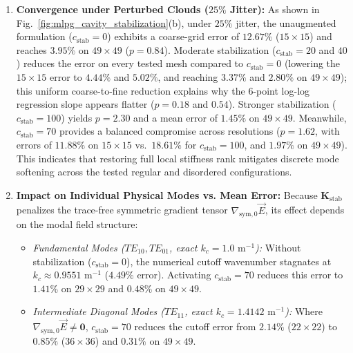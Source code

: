 \documentclass[VANCOUVER,Times1COL]{WileyNJD-v5}
\begin{document}
\begin{enumerate}
    For applications restricted to very coarse point clouds ($15 \times 15$ to $22 \times 22$), a small parameter $c_{\mathrm{stab}} \in [0, 20]$ therefore yields better coarse accuracy ($3.87\%\text{--}6.69\%$) at the cost of slower asymptotic convergence ($p \le 1.06$). Higher stabilization ($c_{\mathrm{stab}} \ge 70$), on the other hand, recovers near-quadratic empirical rates ($p \ge 2.15$) on the tested mesh sequence.
    \item \textbf{Convergence under Perturbed Clouds ($25\%$ Jitter):} As shown in Fig.~\ref{fig:mlpg_cavity_stabilization}(b), under $25\%$ jitter, the unaugmented formulation ($c_{\mathrm{stab}} = 0$) exhibits a coarse-grid error of $12.67\%$ ($15\times 15$) and reaches $3.95\%$ on $49 \times 49$ ($p = 0.84$). Moderate stabilization ($c_{\mathrm{stab}} = 20$ and $40$) reduces the error on every tested mesh compared to $c_{\mathrm{stab}} = 0$ (lowering the $15\times 15$ error to $4.44\%$ and $5.02\%$, and reaching $3.37\%$ and $2.80\%$ on $49\times 49$); this uniform coarse-to-fine reduction explains why the 6-point log-log regression slope appears flatter ($p = 0.18$ and $0.54$). Stronger stabilization ($c_{\mathrm{stab}} = 100$) yields $p = 2.30$ and a mean error of $\mathbf{1.45\%}$ on $49 \times 49$. Meanwhile, $c_{\mathrm{stab}} = 70$ provides a balanced compromise across resolutions ($p = 1.62$, with errors of $11.88\%$ on $15 \times 15$ vs.\ $18.61\%$ for $c_{\mathrm{stab}} = 100$, and $1.97\%$ on $49 \times 49$). This indicates that restoring full local stiffness rank mitigates discrete mode softening across the tested regular and disordered configurations.
\item \textbf{Impact on Individual Physical Modes vs. Mean Error:}
Because $\mathbf{K}_{\mathrm{stab}}$ penalizes the trace-free symmetric gradient tensor $\nabla_{\mathrm{sym},0}\vec{E}$, its effect depends on the modal field structure:
\begin{itemize}
    \item \emph{Fundamental Modes ($TE_{10}, TE_{01}$, exact $k_c = 1.0\text{ m}^{-1}$):} Without stabilization ($c_{\mathrm{stab}} = 0$), the numerical cutoff wavenumber stagnates at $k_c \approx 0.9551\text{ m}^{-1}$ ($4.49\%$ error). Activating $c_{\mathrm{stab}} = 70$ reduces this error to $1.41\%$ on $29 \times 29$ and $\mathbf{0.48\%}$ on $49 \times 49$.
    \item \emph{Intermediate Diagonal Modes ($TE_{11}$, exact $k_c = 1.4142\text{ m}^{-1}$):} Where $\nabla_{\mathrm{sym},0}\vec{E} \ne \mathbf{0}$, $c_{\mathrm{stab}} = 70$ reduces the cutoff error from $2.14\%$ ($22 \times 22$) to $0.85\%$ ($36 \times 36$) and $\mathbf{0.31\%}$ on $49 \times 49$.

\end{itemize}
\end{enumerate}
\end{document}
